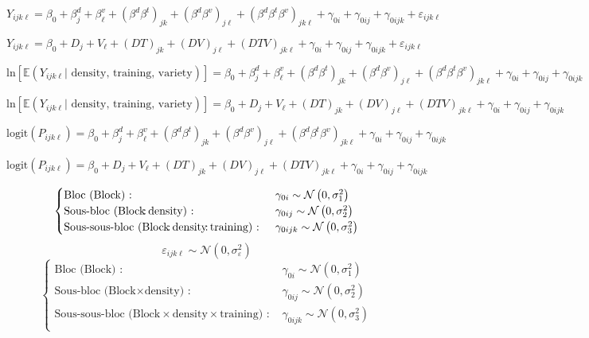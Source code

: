 \documentclass[a4paper, landscape, 11pt]{article}
\title{}
\author{}
\date{}
\begin{document}
\LARGE
\[
Y_{ijk\ell} = \beta_0 + \beta_j^d + \beta_{\ell}^v + \left( \beta^d\beta^t \right)_{jk} + \left( \beta^d\beta^v \right)_{j\ell} + \left( \beta^d\beta^t\beta^v \right)_{jk\ell} +\gamma_{0i} + \gamma_{0ij} + \gamma_{0ijk}  + \varepsilon_{ijk\ell}
\]

\newpage

\[
Y_{ijk\ell} = \beta_0 + D_j + V_\ell + \left( DT \right)_{jk} + \left( DV \right)_{j\ell} + \left( DTV \right)_{jk\ell} +\gamma_{0i} + \gamma_{0ij} + \gamma_{0ijk}  + \varepsilon_{ijk\ell}
\]

\newpage

\[
\text{ln}\left[\mathbb{E}\left( Y_{ijk\ell} | \text{ density, training, variety} \right) \right] = \beta_0 + \beta_j^d + \beta_{\ell}^v + \left( \beta^d\beta^t \right)_{jk} + \left( \beta^d\beta^v \right)_{j\ell} + \left( \beta^d\beta^t\beta^v \right)_{jk\ell} +\gamma_{0i} + \gamma_{0ij} + \gamma_{0ijk} 
\]

\newpage

\[
\text{ln}\left[\mathbb{E}\left( Y_{ijk\ell} | \text{ density, training, variety} \right) \right] = \beta_0 + D_j + V_\ell + \left( DT \right)_{jk} + \left( DV \right)_{j\ell} + \left( DTV \right)_{jk\ell}+\gamma_{0i} + \gamma_{0ij} + \gamma_{0ijk} 
\]

\newpage

\[
\text{logit}\left( P_{ijk\ell} \right) = \beta_0 + \beta_j^d + \beta_{\ell}^v + \left( \beta^d\beta^t \right)_{jk} + \left( \beta^d\beta^v \right)_{j\ell} + \left( \beta^d\beta^t\beta^v \right)_{jk\ell}+\gamma_{0i} + \gamma_{0ij} + \gamma_{0ijk} 
\]


\newpage

\[
\text{logit}\left( P_{ijk\ell} \right) = \beta_0 + D_j + V_\ell + \left( DT \right)_{jk} + \left( DV \right)_{j\ell} + \left( DTV \right)_{jk\ell}+\gamma_{0i} + \gamma_{0ij} + \gamma_{0ijk} 
\]

\newpage

\[
\begin{cases}
 \text{Bloc (Block) : } & \gamma_{0i} \sim \mathcal{N}\left( 0, \sigma_1^2 \right)\\
 \text{Sous-bloc (Block\!:\,density) : } & \gamma_{0ij} \sim \mathcal{N}\left( 0, \sigma_2^2 \right)\\
 \text{Sous-sous-bloc (Block\!:\,density\!:\,training) : } & \gamma_{0ijk} \sim \mathcal{N}\left( 0, \sigma_3^2 \right)\\
\end{cases}
\]
\vspace{3cm}
\[
\varepsilon_{ijk\ell} \sim \mathcal{N}\left( 0, \sigma^2_\varepsilon \right)
\]
\vspace{2cm}
\[
\begin{cases}
 \text{Bloc (Block) : } & \gamma_{0i} \sim \mathcal{N}\left( 0, \sigma_1^2 \right)\\
 \text{Sous-bloc (Block$\times$density) : } & \gamma_{0ij} \sim \mathcal{N}\left( 0, \sigma_2^2 \right)\\
 \text{Sous-sous-bloc (Block$\times$density$\times$training) : } & \gamma_{0ijk} \sim \mathcal{N}\left( 0, \sigma_3^2 \right)\\
\end{cases}
\]
\end{document}
